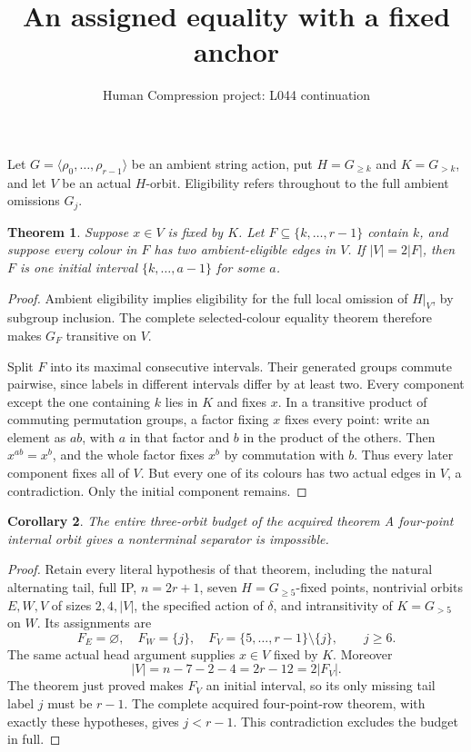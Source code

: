 \documentclass[11pt,a4paper]{article}
\title{An assigned equality with a fixed anchor}
\author{Human Compression project: L044 continuation}
\date{}
\newtheorem{theorem}{Theorem}
\newtheorem{corollary}[theorem]{Corollary}
\newcommand{\gen}[1]{\langle#1\rangle}
\begin{document}
\maketitle
Let $G=\gen{\rho_0,\ldots,\rho_{r-1}}$ be an ambient
string action, put $H=G_{\ge k}$ and $K=G_{>k}$, and
let $V$ be an actual $H$-orbit. Eligibility refers throughout
to the full ambient omissions $G_j$.

\begin{theorem}
Suppose $x\in V$ is fixed by $K$. Let
$F\subseteq\{k,\ldots,r-1\}$ contain $k$, and suppose
every colour in $F$ has two ambient-eligible edges in $V$.
If $|V|=2|F|$, then $F$ is one initial interval
$\{k,\ldots,a-1\}$ for some $a$.
\end{theorem}
\begin{proof}
Ambient eligibility implies eligibility for the full local
omission of $H|_V$, by subgroup inclusion. The complete
selected-colour equality theorem therefore makes $G_F$
transitive on $V$.

Split $F$ into its maximal consecutive intervals.
Their generated groups commute pairwise, since labels in
different intervals differ by at least two. Every component
except the one containing $k$ lies in $K$ and fixes $x$.
In a transitive product of commuting permutation groups,
a factor fixing $x$ fixes every point: write an element
as $ab$, with $a$ in that factor and $b$ in the product
of the others. Then $x^{ab}=x^b$, and the whole factor
fixes $x^b$ by commutation with $b$.
Thus every later component fixes all of $V$. But every
one of its colours has two actual edges in $V$, a
contradiction. Only the initial component remains.
\end{proof}

\begin{corollary}
The entire three-orbit budget of the acquired theorem
\emph{A four-point internal orbit gives a nonterminal
separator} is impossible.
\end{corollary}
\begin{proof}
Retain every literal hypothesis of that theorem, including
the natural alternating tail, full IP, $n=2r+1$, seven
$H=G_{\ge5}$-fixed points, nontrivial orbits $E,W,V$
of sizes $2,4,|V|$, the specified action of $\delta$,
and intransitivity of $K=G_{>5}$ on $W$.
Its assignments are
\[
 F_E=\varnothing,\quad F_W=\{j\},\quad
 F_V=\{5,\ldots,r-1\}\setminus\{j\},\qquad j\ge6.
\]
The same actual head argument supplies $x\in V$ fixed
by $K$. Moreover
\[
 |V|=n-7-2-4=2r-12=2|F_V|.
\]
The theorem just proved makes $F_V$ an initial interval,
so its only missing tail label $j$ must be $r-1$.
The complete acquired four-point-row theorem, with
exactly these hypotheses, gives $j<r-1$.
This contradiction excludes the budget in full.
\end{proof}
\end{document}
